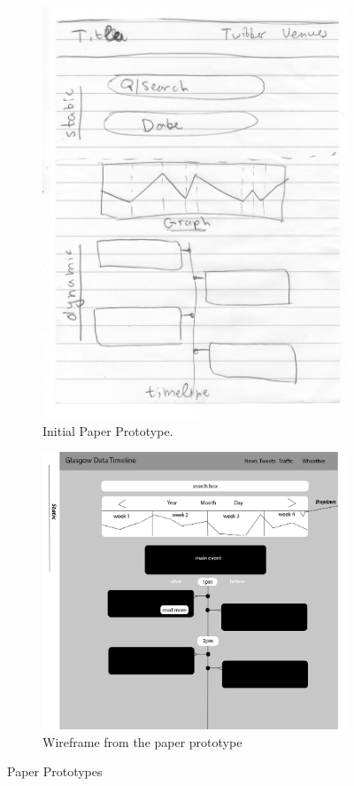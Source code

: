 \documentclass{l4proj}
\begin{document}
\begin{figure}[H]
\begin{subfigure}{.33\textwidth}
		\includegraphics[width=\textwidth]{images/initialPaperPrototype}
		\caption{Initial Paper Prototype.}
		\label{initialPaperPrototype}
	\end{subfigure}
	\begin{subfigure}{.33\textwidth}
		\centering
		\includegraphics[width=\textwidth]{images/initialWireframe}
		\caption{Wireframe from the paper prototype}
		\label{initialWireframe}
	\end{subfigure}
	\caption{Paper Prototypes}
\end{figure} 
\end{document}
